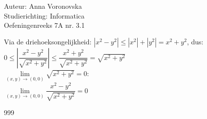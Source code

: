 \documentclass[a4paper]{article}
\begin{document}
  
\noindent \large Auteur: Anna Voronovska \\
\noindent \large Studierichting: Informatica\\
\noindent \large Oefeningenreeks 7A nr. 3.1\\

\medskip

\normalsize

Via de driehoeksongelijkheid: $|x^2-y^2| \leq |x^2|+|y^2| = x^2+y^2$, dus:\\

$0 \leq \left|\dfrac{x^2-y^2}{\sqrt{x^2+y^2}}\right| \leq \dfrac{x^2+y^2}{\sqrt{x^2+y^2}} = \sqrt{x^2+y^2}$\\

$\lim\limits_{(x,y)\to(0,0)} \sqrt{x^2+y^2} = 0$:\\

$\lim\limits_{(x,y)\to(0,0)} \dfrac{x^2-y^2}{\sqrt{x^2+y^2}} = 0$



\begin{thebibliography}{999}
\end{thebibliography}
\end{document}
